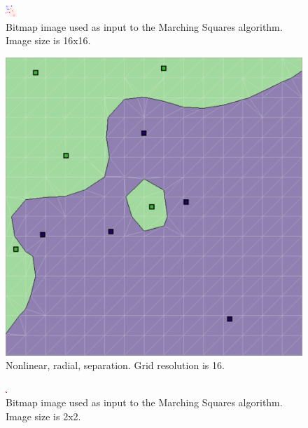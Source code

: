 \documentclass[12pt]{article}
\begin{document}
\begin{figure} 
\centering
  \includegraphics[width = 3 in]{16_res_image.png}
  \caption{Bitmap image used as input to the Marching Squares algorithm.
Image size is 16x16.
}
\end{figure}


\begin{figure} 
\centering
  \includegraphics[width = 3 in]{16_res.png}
  \caption{Nonlinear, radial, separation. Grid resolution is 16.
}
\end{figure}

\begin{figure} 
\centering
  \includegraphics[width = 3 in]{2_res_image.png}
  \caption{Bitmap image used as input to the Marching Squares algorithm.
Image size is 2x2.
}
\end{figure}
\end{document}
